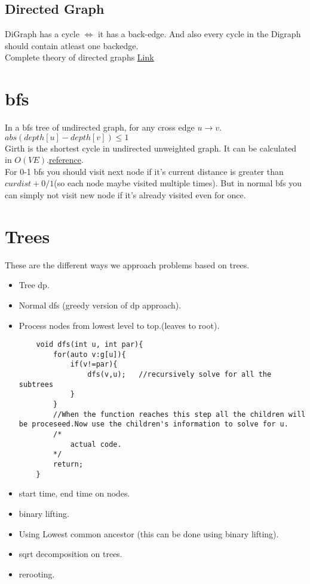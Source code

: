 \documentclass[../Notes.tex]{subfiles}
\begin{document}
\subsection{Directed Graph}

DiGraph has a cycle $\iff$ it has a back-edge. And also every cycle in the Digraph should contain atleast one backedge.\\
Complete theory of directed graphs \href{../Material/Directed Graphs}{Link}

\section{bfs}
In a bfs tree of undirected graph, for any cross edge $u\rightarrow v$. $abs(depth[u]-depth[v])\leq 1$\\

Girth is the shortest cycle in undirected unweighted graph. It can be calculated in $O(VE)$.\href{./Material/Girth.pdf}{reference}.\\

For 0-1 bfs you should visit next node if it's current distance is greater than $curdist+0/1$(so each node maybe visited multiple times). But in normal bfs you can simply not visit new node if it's already visited even for once.

\section{Trees}

These are the different ways we approach problems based on trees.
\begin{itemize}
	\item Tree dp.
	\item Normal dfs (greedy version of dp approach).
	\item Process nodes from lowest level to top.(leaves to root).
	\begin{lstlisting}
	void dfs(int u, int par){
		for(auto v:g[u]){
			if(v!=par){
				dfs(v,u);	//recursively solve for all the subtrees
			}
		}
		//When the function reaches this step all the children will be proceseed.Now use the children's information to solve for u.
		/*
			actual code.
		*/
		return;
	}
	\end{lstlisting}
	\item start time, end time on nodes.
	\item binary lifting.
	\item Using Lowest common ancestor (this can be done using binary lifting).
	\item sqrt decomposition on trees.
	\item rerooting.
\end{itemize}
\end{document}
